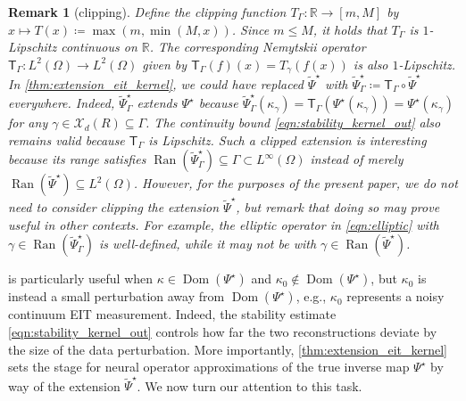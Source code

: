\documentclass[pdflatex,sn-mathphys-num]{sn-jnl-preprint}
\newcommand{\R}{\mathbb{R}}
\newcommand{\cX}{\mathcal{X}}
\newcommand{\defeq}{\coloneqq} %
\DeclareMathOperator{\image}{Ran} %
\DeclareMathOperator{\domain}{Dom} %
\theoremstyle{thmstyleone}%
\theoremstyle{thmstyletwo}%
\newtheorem{remark}{Remark}%
\theoremstyle{thmstylethree}%
\numberwithin{equation}{section}
\numberwithin{theorem}{section}
\begin{document}
\begin{remark}[clipping]
    Define the clipping function $T_\Gamma\colon\R\to [m,M]$ by $x\mapsto T(x)\defeq \max(m,\min(M,x))$. Since $m\leq M$, it holds that $T_\Gamma$ is $1$-Lipschitz continuous on $\R$. The corresponding Nemytskii operator $\mathsf{T}_\Gamma\colon L^2(\Omega)\to L^2(\Omega)$ given by $\mathsf{T}_\Gamma(f)(x)=T_\gamma(f(x))$ is also $1$-Lipschitz. In \cref{thm:extension_eit_kernel}, we could have replaced $\widetilde{\Psi}^\star$ with $\widetilde{\Psi}^\star_{\Gamma}\defeq \mathsf{T}_\Gamma\circ \widetilde{\Psi}^\star$ everywhere. Indeed, $\widetilde{\Psi}^\star_{\Gamma}$ extends $\Psi^\star$ because $\widetilde{\Psi}^\star_{\Gamma}(\kappa_\gamma)=\mathsf{T}_\Gamma(\Psi^\star(\kappa_\gamma))=\Psi^\star(\kappa_\gamma)$ for any $\gamma\in\cX_d(R)\subseteq\Gamma$. The continuity bound \eqref{eqn:stability_kernel_out} also remains valid because $\mathsf{T}_\Gamma$ is Lipschitz.
    Such a clipped extension is interesting because its range satisfies $\image(\widetilde{\Psi}^\star_{\Gamma})\subseteq \Gamma\subset L^\infty(\Omega)$ instead of merely $\image(\widetilde{\Psi}^\star)\subseteq L^2(\Omega)$. However, for the purposes of the present paper, we do not need to consider clipping the extension $\widetilde{\Psi}^\star$, but remark that doing so may prove useful in other contexts. For example, the elliptic operator in \eqref{eqn:elliptic} with $\gamma\in \image(\widetilde{\Psi}^\star_{\Gamma})$ is well-defined, while it may not be with $\gamma\in \image(\widetilde{\Psi}^\star)$.
\end{remark}

 is particularly useful when $\kappa\in\domain(\Psi^\star)$ and $\kappa_0\not\in\domain(\Psi^\star)$, but $\kappa_0$ is instead a small perturbation away from $\domain(\Psi^\star)$, e.g., $\kappa_0$ represents a noisy continuum EIT measurement. Indeed, the stability estimate \eqref{eqn:stability_kernel_out} controls how far the two reconstructions deviate by the size of the data perturbation. More importantly, \cref{thm:extension_eit_kernel} sets the stage for neural operator approximations of the true inverse map $\Psi^\star$ by way of the extension $\widetilde{\Psi}^\star$. We now turn our attention to this task.
\end{document}
